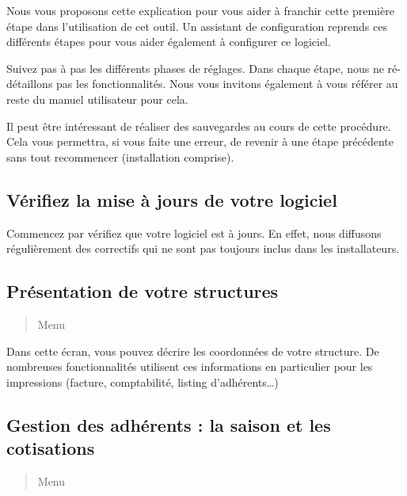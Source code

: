 \documentclass[a4paper,10pt,oneside,french]{sphinxmanual}
\begin{document}
Nous vous proposons cette explication pour vous aider à franchir cette première étape dans l’utilisation de cet outil.
Un assistant de configuration reprends ces différents étapes pour vous aider également à configurer ce logiciel.

Suivez pas à pas les différents phases de réglages. Dans chaque étape, nous ne ré-détaillons pas les fonctionnalités.
Nous vous invitons également à vous référer au reste du manuel utilisateur pour cela.

Il peut être intéressant de réaliser des sauvegardes au cours de cette procédure.
Cela vous permettra, si vous faite une erreur, de revenir à une étape précédente sans tout recommencer (installation comprise).


\subsection{Vérifiez la mise à jours de votre logiciel}
\label{\detokenize{asso/first_step:verifiez-la-mise-a-jours-de-votre-logiciel}}
Commencez par vérifiez que votre logiciel est à jours.
En effet, nous diffusons régulièrement des correctifs qui ne sont pas toujours inclus dans les installateurs.


\subsection{Présentation de votre structures}
\label{\detokenize{asso/first_step:presentation-de-votre-structures}}\begin{quote}

Menu 
\end{quote}

Dans cette écran, vous pouvez décrire les coordonnées de votre structure.
De nombreuses fonctionnalités utilisent ces informations en particulier pour les impressions (facture, comptabilité, listing d’adhérents…)


\subsection{Gestion des adhérents : la saison et les cotisations}
\label{\detokenize{asso/first_step:gestion-des-adherents-la-saison-et-les-cotisations}}\begin{quote}

Menu 
\end{quote}
\end{document}
